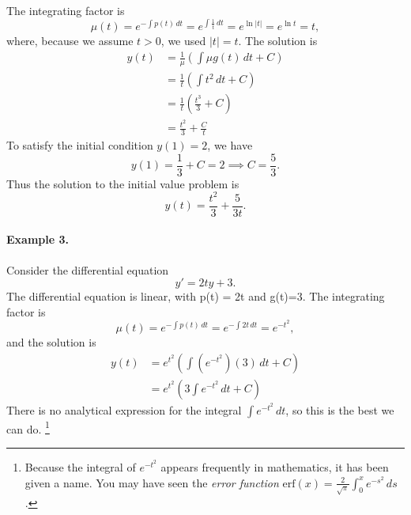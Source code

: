 \documentclass{book}
\begin{document}
The integrating factor is
\begin{equation}
   \mu(t) = e^{-\int p(t)\,dt} = e^{\int \frac{1}{t}\, dt}
      = e^{\ln |t|} = e^{\ln t} = t,
\end{equation}
where, because we assume $t>0$,  we used $|t|=t$.
The solution is
\begin{equation}
\begin{split}
   y(t) & = \frac{1}{\mu} \left( \int \mu g(t)\,dt + C\right) \\
        & = \frac{1}{t} \left( \int t^2 \,dt+C\right) \\
	& = \frac{1}{t} \left( \frac{t^3}{3} + C \right)\\
	& = \frac{t^2}{3} + \frac{C}{t}
\end{split}
\end{equation}
To satisfy the initial condition $y(1)=2$, we have
\begin{equation}
   y(1) = \frac{1}{3} + C = 2 \implies C = \frac{5}{3}.
\end{equation}
Thus the solution to the initial value problem is
\begin{equation}
   y(t) = \frac{t^2}{3} + \frac{5}{3t}.
\end{equation}


\paragraph{Example 3.}
Consider the differential equation
\begin{equation}
    y' = 2ty + 3.
\end{equation}
The differential equation is linear, with p(t) = 2t and g(t)=3.
The integrating factor is
\begin{equation}
   \mu(t) = e^{-\int p(t)\,dt} = e^{-\int 2t\, dt}
      = e^{-t^2},
\end{equation}
and the solution is
\begin{equation}
\begin{split}
   y(t) & = e^{t^2} \left( \int \left(e^{-t^2}\right)\left(3\right)\,dt + C\right) \\
        & = e^{t^2} \left( 3\int e^{-t^2}\,dt+C\right)
\end{split}
\end{equation}
There is no analytical expression for the integral $\int e^{-t^2}\, dt$,
so this is the best we can do.%
\footnote{%
Because the integral of $e^{-t^2}$ appears frequently in mathematics,
it has been given a name.
You may have seen the \emph{error function}
$\textrm{erf}(x) = \frac{2}{\sqrt{\pi}}\int_0^x e^{-s^2}\,ds$.}
\end{document}
